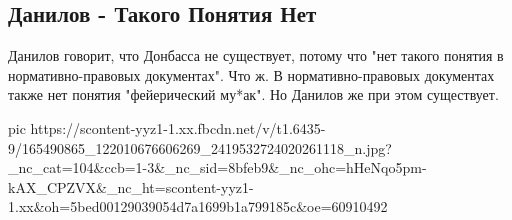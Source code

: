  
 
 
 
 

\subsection{Данилов - Такого Понятия Нет}

Данилов говорит, что Донбасса не существует, потому что "нет такого понятия в
нормативно-правовых документах". Что ж. В нормативно-правовых документах также
нет понятия "фейерический му*ак". Но Данилов же при этом существует.

\ifcmt
  pic https://scontent-yyz1-1.xx.fbcdn.net/v/t1.6435-9/165490865_122010676606269_2419532724020261118_n.jpg?_nc_cat=104&ccb=1-3&_nc_sid=8bfeb9&_nc_ohc=hHeNqo5pm-kAX_CPZVX&_nc_ht=scontent-yyz1-1.xx&oh=5bed00129039054d7a1699b1a799185c&oe=60910492
\fi

